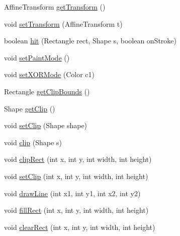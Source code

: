\begin{DoxyCompactItemize}
\item 
Affine\+Transform \mbox{\hyperlink{classorg_1_1jfree_1_1chart_1_1fx_1_1_f_x_graphics2_d_a8385cc1fdd10671f78bc775a2129575e}{get\+Transform}} ()
\item 
void \mbox{\hyperlink{classorg_1_1jfree_1_1chart_1_1fx_1_1_f_x_graphics2_d_a9d5c4e160b2037726b9cbc3b6e6f2d52}{set\+Transform}} (Affine\+Transform t)
\item 
boolean \mbox{\hyperlink{classorg_1_1jfree_1_1chart_1_1fx_1_1_f_x_graphics2_d_a85396161a1be5e730eff632966fef036}{hit}} (Rectangle rect, Shape s, boolean on\+Stroke)
\item 
void \mbox{\hyperlink{classorg_1_1jfree_1_1chart_1_1fx_1_1_f_x_graphics2_d_a2c7f883ba59cff913c237188492fb437}{set\+Paint\+Mode}} ()
\item 
void \mbox{\hyperlink{classorg_1_1jfree_1_1chart_1_1fx_1_1_f_x_graphics2_d_a178856b9a49e779fb1b7d96fae2e3985}{set\+X\+O\+R\+Mode}} (Color c1)
\item 
Rectangle \mbox{\hyperlink{classorg_1_1jfree_1_1chart_1_1fx_1_1_f_x_graphics2_d_a037c9ec5dddafc7cb1704f356380fd09}{get\+Clip\+Bounds}} ()
\item 
Shape \mbox{\hyperlink{classorg_1_1jfree_1_1chart_1_1fx_1_1_f_x_graphics2_d_adab65fa84e10b25840c2d8af0f2e3356}{get\+Clip}} ()
\item 
void \mbox{\hyperlink{classorg_1_1jfree_1_1chart_1_1fx_1_1_f_x_graphics2_d_a47e55ffaa4b2dcc54b53c506e4ed67be}{set\+Clip}} (Shape shape)
\item 
void \mbox{\hyperlink{classorg_1_1jfree_1_1chart_1_1fx_1_1_f_x_graphics2_d_a084d66371e3c9b8bd867332d21d6d500}{clip}} (Shape s)
\item 
void \mbox{\hyperlink{classorg_1_1jfree_1_1chart_1_1fx_1_1_f_x_graphics2_d_a294b10401b9a0d6bfeea903cc935e671}{clip\+Rect}} (int x, int y, int width, int height)
\item 
void \mbox{\hyperlink{classorg_1_1jfree_1_1chart_1_1fx_1_1_f_x_graphics2_d_a36299ed05b4a5a1d2ae8e71cbb347b7d}{set\+Clip}} (int x, int y, int width, int height)
\item 
void \mbox{\hyperlink{classorg_1_1jfree_1_1chart_1_1fx_1_1_f_x_graphics2_d_a580a81c2b8773aba9e9f9e85bfaf11f3}{draw\+Line}} (int x1, int y1, int x2, int y2)
\item 
void \mbox{\hyperlink{classorg_1_1jfree_1_1chart_1_1fx_1_1_f_x_graphics2_d_abe3d43dfa222e130a0e2e30e9174a49e}{fill\+Rect}} (int x, int y, int width, int height)
\item 
void \mbox{\hyperlink{classorg_1_1jfree_1_1chart_1_1fx_1_1_f_x_graphics2_d_afd91faf8ad68982c6c1be9931e7976c8}{clear\+Rect}} (int x, int y, int width, int height)

\end{DoxyCompactItemize}
